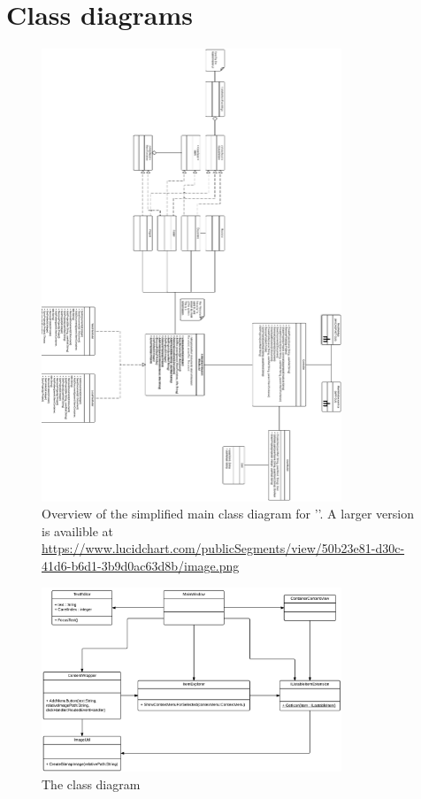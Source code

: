 \section{Class diagrams}
\label{sec:class-diagrams-appendix}

\begin{figure}[H]
    \begin{center}
        \includegraphics[width=0.8\textwidth]{Software_design/graphics/mainClassDiagram.png}
	\caption{Overview of the simplified main class diagram for '\SOP{}'. A larger version is availible at \url{https://www.lucidchart.com/publicSegments/view/50b23e81-d30c-41d6-b6d1-3b9d0ac63d8b/image.png}}
        \label{fig:design-class_diagram} 
    \end{center}
\end{figure}

\begin{figure}[htb]
    \centering
    \includegraphics[width=0.8\textwidth]{Software_design/graphics/MainWindow.png}
    \caption{The \SOP{} class diagram}
    \label{fig:mainwindow-diagram}
\end{figure}

